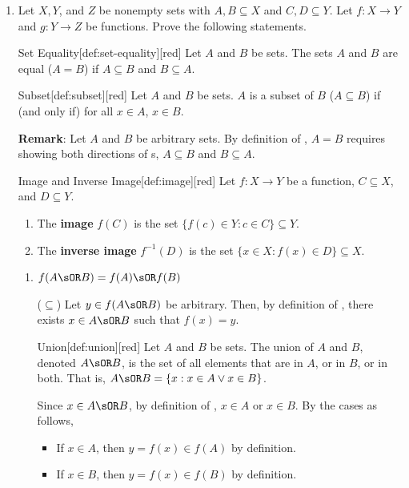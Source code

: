 \begin{enumerate}
  \newpage 
  \item Let $X, Y$, and $Z$ be nonempty sets with $A, B \subseteq X$ and $C, D \subseteq Y$. 
  Let $f: X \rightarrow Y$ and $g: Y \rightarrow Z$ be functions. 
  Prove the following statements.
  \begin{define}{Set Equality}[def:set-equality][red]
    Let $A$ and $B$ be sets. The sets $A$ and $B$ are equal ($A = B$) if $A \subseteq B$ and $B \subseteq A$.
  \end{define}
  \begin{define}{Subset}[def:subset][red]
    Let $A$ and $B$ be sets. $A$ is a subset of $B$ ($A \subseteq B$) if (and only if) for all $x \in A$, $x \in B$.
  \end{define}
  \textbf{Remark}: Let $A$ and $B$ be arbitrary sets. By definition of , 
  $A = B$ requires showing both directions of s, $A \subseteq B$ and $B \subseteq A$.
  \begin{define}{Image and Inverse Image}[def:image][red]
    Let $f : X \to Y$ be a function, $C\subseteq X$, and $D\subseteq Y$. 
    \begin{enumerate}
      \item The \textbf{image} $f(C)$ is the set $\{f(c) \in Y : c \in C\} \subseteq Y$.
      \item The \textbf{inverse image} $f^{-1}(D)$ is the set $\{x \in X : f(x) \in D\} \subseteq X$.
    \end{enumerate}
  \end{define} 
  \begin{enumerate}
    \item $f(A \sOR B)=f(A) \sOR f(B)$ \label{prob:3a}
    \begin{subprove}
      ($\subseteq$) Let $y \in f(A \sOR B)$ be arbitrary. Then, by definition of , 
      there exists $x \in A \sOR B$ such that $f(x) = y$.
      \begin{define}{Union}[def:union][red]
        Let $A$ and $B$ be sets. The union of $A$ and $B$, denoted $A \sOR B$, is the set of all elements that are in $A$, or in $B$, or in both. That is, $A \sOR B = \{x : x \in A \lor x \in B\}$.
      \end{define}
      Since $x \in A \sOR B$, by definition of , $x \in A$ or $x \in B$. By the cases as follows,
      \begin{itemize}
        \item If $x \in A$, then $y = f(x) \in f(A)$ by definition.
        \item If $x \in B$, then $y = f(x) \in f(B)$ by definition.

\end{itemize}
\end{subprove}
\end{enumerate}
\end{enumerate}
